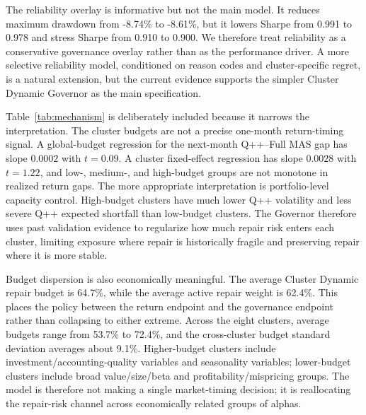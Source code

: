 \documentclass[sigconf,nonacm]{acmart}
\begin{document}
The reliability overlay is informative but not the main model. It reduces maximum drawdown from -8.74\% to -8.61\%, but it lowers Sharpe from 0.991 to 0.978 and stress Sharpe from 0.910 to 0.900. We therefore treat reliability as a conservative governance overlay rather than as the performance driver. A more selective reliability model, conditioned on reason codes and cluster-specific regret, is a natural extension, but the current evidence supports the simpler Cluster Dynamic Governor as the main specification.

\begin{table}[t]
\centering
\caption{Mechanism diagnostics. Buckets are cluster-months sorted by \(b_{c,t}\). Return gaps are monthly; volatility and ES5 are computed over the bucket sample.}
\label{tab:mechanism}
\scriptsize
\setlength{\tabcolsep}{2.5pt}
\end{table}

Table~\ref{tab:mechanism} is deliberately included because it narrows the interpretation. The cluster budgets are not a precise one-month return-timing signal. A global-budget regression for the next-month Q++--Full MAS gap has slope \(0.0002\) with \(t=0.09\). A cluster fixed-effect regression has slope \(0.0028\) with \(t=1.22\), and low-, medium-, and high-budget groups are not monotone in realized return gaps. The more appropriate interpretation is portfolio-level capacity control. High-budget clusters have much lower Q++ volatility and less severe Q++ expected shortfall than low-budget clusters. The Governor therefore uses past validation evidence to regularize how much repair risk enters each cluster, limiting exposure where repair is historically fragile and preserving repair where it is more stable.

Budget dispersion is also economically meaningful. The average Cluster Dynamic repair budget is 64.7\%, while the average active repair weight is 62.4\%. This places the policy between the return endpoint and the governance endpoint rather than collapsing to either extreme. Across the eight clusters, average budgets range from 53.7\% to 72.4\%, and the cross-cluster budget standard deviation averages about 9.1\%. Higher-budget clusters include investment/accounting-quality variables and seasonality variables; lower-budget clusters include broad value/size/beta and profitability/mispricing groups. The model is therefore not making a single market-timing decision; it is reallocating the repair-risk channel across economically related groups of alphas.
\end{document}

